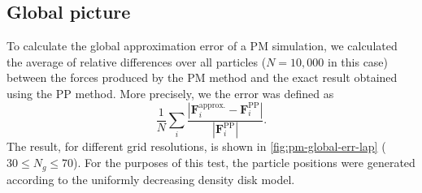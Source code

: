 \subsection{Global picture}\label{subsubsec:pm-global-picture}
To calculate the global approximation error of a PM simulation, we calculated the average of relative differences over all particles ($N=10{,}000$ in this case) between the forces produced by the PM method and the exact result obtained using the PP method.
More precisely, we the error was defined as
\begin{equation}\label{eq:force-avg-relative-err}
    \frac{1}{N}\sum_{i} \frac{|\mathbf{F}_i^\text{approx.} - \mathbf{F}_i^\text{PP}|}{|\mathbf{F}_i^\text{PP}|}.
\end{equation}
The result, for different grid resolutions, is shown in \autoref{fig:pm-global-err-lap} ( $30 \leq N_g \leq 70$).
For the purposes of this test, the particle positions were generated according to the uniformly decreasing density disk model.

